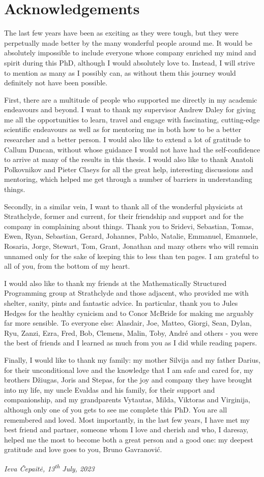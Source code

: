 \chapter{Acknowledgements}

The last few years have been as exciting as they were tough, but they were perpetually made better by the many wonderful people around me. It would be absolutely impossible to include everyone whose company enriched my mind and spirit during this PhD, although I would absolutely love to. Instead, I will strive to mention as many as I possibly can, as without them this journey would definitely not have been possible.

First, there are a multitude of people who supported me directly in my academic endeavours and beyond. I want to thank my supervisor Andrew Daley for giving me all the opportunities to learn, travel and engage with fascinating, cutting-edge scientific endeavours as well as for mentoring me in both how to be a better researcher and a better person. I would also like to extend a lot of gratitude to Callum Duncan, without whose guidance I would not have had the self-confidence to arrive at many of the results in this thesis. I would also like to thank Anatoli Polkovnikov and Pieter Claeys for all the great help, interesting discussions and mentoring, which helped me get through a number of barriers in understanding things.

Secondly, in a similar vein, I want to thank all of the wonderful physicists at Strathclyde, former and current, for their friendship and support and for the company in complaining about things. Thank you to Sridevi, Sebastian, Tomas, Ewen, Ryan, Sebastian, Gerard, Johannes, Pablo, Natalie, Emmanuel, Emanuele, Rosaria, Jorge, Stewart, Tom, Grant, Jonathan and many others who will remain unnamed only for the sake of keeping this to less than ten pages. I am grateful to all of you, from the bottom of my heart. 

I would also like to thank my friends at the Mathematically Structured Programming group at Strathclyde and those adjacent, who provided me with shelter, sanity, pints and fantastic advice. In particular, thank you to Jules Hedges for the healthy cynicism and to Conor McBride for making me arguably far more sensible. To everyone else: Alasdair, Joe, Matteo, Giorgi, Sean, Dylan, Ryu, Zanzi, Ezra, Fred, Bob, Clemens, Malin, Toby, André and others - you were the best of friends and I learned as much from you as I did while reading papers.

Finally, I would like to thank my family: my mother Silvija and my father Darius, for their unconditional love and the knowledge that I am safe and cared for, my brothers Džiugas, Joris and Stepas, for the joy and company they have brought into my life, my uncle Evaldas and his family, for their support and companionship, and my grandparents Vytautas, Milda, Viktoras and Virginija, although only one of you gets to see me complete this PhD. You are all remembered and loved. Most importantly, in the last few years, I have met my best friend and partner, someone whom I love and cherish and who, I daresay, helped me the most to become both a great person and a good one: my deepest gratitude and love goes to you, Bruno Gavranović.

\begin{flushright}
\emph{Ieva \v{C}epait\.{e}, 13\textsuperscript{th} July, 2023}
\end{flushright}